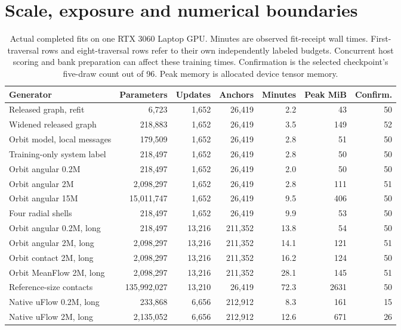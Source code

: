 \section{Scale, exposure and numerical boundaries}

\begin{table}[!htbp]\centering\small\setlength{\tabcolsep}{3.6pt}
\caption{Actual completed fits on one RTX 3060 Laptop GPU. Minutes are observed fit-receipt wall times. First-traversal rows and eight-traversal rows refer to their own independently labeled budgets. Concurrent host scoring and bank preparation can affect these training times. Confirmation is the selected checkpoint's five-draw count out of 96. Peak memory is allocated device tensor memory.}
\begin{tabular}{lrrrrrr}\hline
Generator & Parameters & Updates & Anchors & Minutes & Peak MiB & Confirm.\\\hline
Released graph, refit & 6,723 & 1,652 & 26,419 & 2.2 & 43 & 50\\
Widened released graph & 218,883 & 1,652 & 26,419 & 3.5 & 149 & 52\\
Orbit model, local messages & 179,509 & 1,652 & 26,419 & 2.8 & 51 & 50\\
Training-only system label & 218,497 & 1,652 & 26,419 & 2.8 & 50 & 50\\
Orbit angular 0.2M & 218,497 & 1,652 & 26,419 & 2.0 & 50 & 50\\
Orbit angular 2M & 2,098,297 & 1,652 & 26,419 & 2.8 & 111 & 51\\
Orbit angular 15M & 15,011,747 & 1,652 & 26,419 & 9.5 & 406 & 50\\
Four radial shells & 218,497 & 1,652 & 26,419 & 9.9 & 53 & 50\\
Orbit angular 0.2M, long & 218,497 & 13,216 & 211,352 & 13.8 & 54 & 50\\
Orbit angular 2M, long & 2,098,297 & 13,216 & 211,352 & 14.1 & 121 & 51\\
Orbit contact 2M, long & 2,098,297 & 13,216 & 211,352 & 16.2 & 124 & 50\\
Orbit MeanFlow 2M, long & 2,098,297 & 13,216 & 211,352 & 28.1 & 145 & 51\\
Reference-size contacts & 135,992,027 & 13,210 & 26,419 & 72.3 & 2631 & 50\\
Native uFlow 0.2M, long & 233,868 & 6,656 & 212,912 & 8.3 & 161 & 15\\
Native uFlow 2M, long & 2,135,052 & 6,656 & 212,912 & 12.6 & 671 & 26\\
\hline\end{tabular}\end{table}

